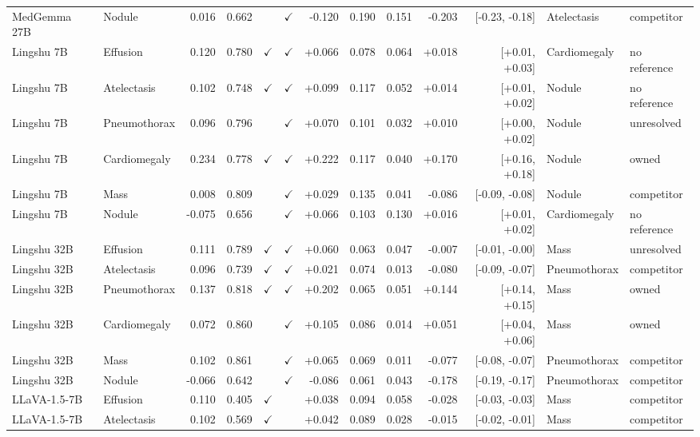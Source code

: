 \begin{longtable}{llrrccrrrrrll}
MedGemma 27B & Nodule & 0.016 & 0.662 &  & $\checkmark$ & -0.120 & 0.190 & 0.151 & -0.203 & [-0.23, -0.18] & Atelectasis & competitor \\
Lingshu 7B & Effusion & 0.120 & 0.780 & $\checkmark$ & $\checkmark$ & +0.066 & 0.078 & 0.064 & +0.018 & [+0.01, +0.03] & Cardiomegaly & no reference \\
Lingshu 7B & Atelectasis & 0.102 & 0.748 & $\checkmark$ & $\checkmark$ & +0.099 & 0.117 & 0.052 & +0.014 & [+0.01, +0.02] & Nodule & no reference \\
Lingshu 7B & Pneumothorax & 0.096 & 0.796 &  & $\checkmark$ & +0.070 & 0.101 & 0.032 & +0.010 & [+0.00, +0.02] & Nodule & unresolved \\
\rowcolor{cfSlate2}Lingshu 7B & Cardiomegaly & 0.234 & 0.778 & $\checkmark$ & $\checkmark$ & +0.222 & 0.117 & 0.040 & +0.170 & [+0.16, +0.18] & Nodule & owned \\
Lingshu 7B & Mass & 0.008 & 0.809 &  & $\checkmark$ & +0.029 & 0.135 & 0.041 & -0.086 & [-0.09, -0.08] & Nodule & competitor \\
Lingshu 7B & Nodule & -0.075 & 0.656 &  & $\checkmark$ & +0.066 & 0.103 & 0.130 & +0.016 & [+0.01, +0.02] & Cardiomegaly & no reference \\
Lingshu 32B & Effusion & 0.111 & 0.789 & $\checkmark$ & $\checkmark$ & +0.060 & 0.063 & 0.047 & -0.007 & [-0.01, -0.00] & Mass & unresolved \\
Lingshu 32B & Atelectasis & 0.096 & 0.739 & $\checkmark$ & $\checkmark$ & +0.021 & 0.074 & 0.013 & -0.080 & [-0.09, -0.07] & Pneumothorax & competitor \\
\rowcolor{cfSlate2}Lingshu 32B & Pneumothorax & 0.137 & 0.818 & $\checkmark$ & $\checkmark$ & +0.202 & 0.065 & 0.051 & +0.144 & [+0.14, +0.15] & Mass & owned \\
\rowcolor{cfSlate2}Lingshu 32B & Cardiomegaly & 0.072 & 0.860 &  & $\checkmark$ & +0.105 & 0.086 & 0.014 & +0.051 & [+0.04, +0.06] & Mass & owned \\
Lingshu 32B & Mass & 0.102 & 0.861 &  & $\checkmark$ & +0.065 & 0.069 & 0.011 & -0.077 & [-0.08, -0.07] & Pneumothorax & competitor \\
Lingshu 32B & Nodule & -0.066 & 0.642 &  & $\checkmark$ & -0.086 & 0.061 & 0.043 & -0.178 & [-0.19, -0.17] & Pneumothorax & competitor \\
LLaVA-1.5-7B & Effusion & 0.110 & 0.405 & $\checkmark$ &  & +0.038 & 0.094 & 0.058 & -0.028 & [-0.03, -0.03] & Mass & competitor \\
LLaVA-1.5-7B & Atelectasis & 0.102 & 0.569 & $\checkmark$ &  & +0.042 & 0.089 & 0.028 & -0.015 & [-0.02, -0.01] & Mass & competitor \\

\end{longtable}
